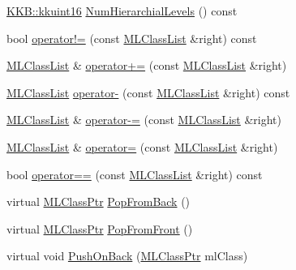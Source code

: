 \begin{DoxyCompactItemize}
\hyperlink{namespace_k_k_b_aa8c7d4d30381c8a0b6fce68974a9c8a9}{K\+K\+B\+::kkuint16} \hyperlink{class_k_k_m_l_l_1_1_m_l_class_list_ac97afce475f0a59f57459942d6801b32}{Num\+Hierarchial\+Levels} () const 
\item 
bool \hyperlink{class_k_k_m_l_l_1_1_m_l_class_list_a37ec9af0599de9aaf557d2c6240e5d3d}{operator!=} (const \hyperlink{class_k_k_m_l_l_1_1_m_l_class_list}{M\+L\+Class\+List} \&right) const 
\item 
\hyperlink{class_k_k_m_l_l_1_1_m_l_class_list}{M\+L\+Class\+List} \& \hyperlink{class_k_k_m_l_l_1_1_m_l_class_list_a43a6c846a4aa27e7ceefa0834a8b7b0d}{operator+=} (const \hyperlink{class_k_k_m_l_l_1_1_m_l_class_list}{M\+L\+Class\+List} \&right)
\item 
\hyperlink{class_k_k_m_l_l_1_1_m_l_class_list}{M\+L\+Class\+List} \hyperlink{class_k_k_m_l_l_1_1_m_l_class_list_afbcb8a473ffd985001811bcece7eb6c5}{operator-\/} (const \hyperlink{class_k_k_m_l_l_1_1_m_l_class_list}{M\+L\+Class\+List} \&right) const 
\item 
\hyperlink{class_k_k_m_l_l_1_1_m_l_class_list}{M\+L\+Class\+List} \& \hyperlink{class_k_k_m_l_l_1_1_m_l_class_list_adbac987bf2845e17e5910100105cb5db}{operator-\/=} (const \hyperlink{class_k_k_m_l_l_1_1_m_l_class_list}{M\+L\+Class\+List} \&right)
\item 
\hyperlink{class_k_k_m_l_l_1_1_m_l_class_list}{M\+L\+Class\+List} \& \hyperlink{class_k_k_m_l_l_1_1_m_l_class_list_aa113bdf36826306aaddbd168c7475547}{operator=} (const \hyperlink{class_k_k_m_l_l_1_1_m_l_class_list}{M\+L\+Class\+List} \&right)
\item 
bool \hyperlink{class_k_k_m_l_l_1_1_m_l_class_list_abf497eeb9a3b4790098f14b3822ea72c}{operator==} (const \hyperlink{class_k_k_m_l_l_1_1_m_l_class_list}{M\+L\+Class\+List} \&right) const 
\item 
virtual \hyperlink{namespace_k_k_m_l_l_ac272393853d59e72e8456f14cd6d8c23}{M\+L\+Class\+Ptr} \hyperlink{class_k_k_m_l_l_1_1_m_l_class_list_add4473f4d1f638b7c9e71506401657a4}{Pop\+From\+Back} ()
\item 
virtual \hyperlink{namespace_k_k_m_l_l_ac272393853d59e72e8456f14cd6d8c23}{M\+L\+Class\+Ptr} \hyperlink{class_k_k_m_l_l_1_1_m_l_class_list_aa551aed30ac1bcc60b2bdefabc5ea079}{Pop\+From\+Front} ()
\item 
virtual void \hyperlink{class_k_k_m_l_l_1_1_m_l_class_list_ae46d4f51c041d7d4d544bf514c484295}{Push\+On\+Back} (\hyperlink{namespace_k_k_m_l_l_ac272393853d59e72e8456f14cd6d8c23}{M\+L\+Class\+Ptr} ml\+Class)
\item 

\end{DoxyCompactItemize}
